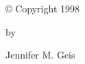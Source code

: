 
\newpage


\par\vspace*{2.5in}

\begin{center}

\copyright\/ Copyright 1998

by

Jennifer M. Geis

\end{center}



